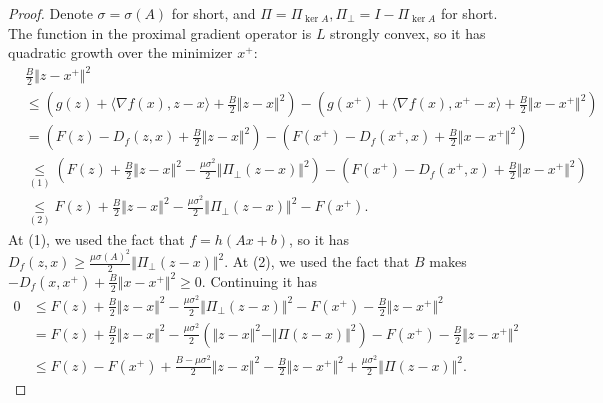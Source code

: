 \documentclass[12pt]{article}
\begin{document}
    \begin{proof}
        Denote $\sigma =\sigma(A)$ for short, and $\Pi = \Pi_{\ker A}, \Pi_{\perp} = I - \Pi_{\ker A}$ for short. 
        The function in the proximal gradient operator is $L$ strongly convex, so it has quadratic growth over the minimizer $x^+$: 
        \begin{align*}
            & \frac{B}{2}\Vert z - x^+\Vert^2
            \\
            &\le 
            \left(
                g(z) + \langle \nabla f(x), z - x\rangle + \frac{B}{2}\Vert z - x\Vert^2
            \right)
            - \left(
                g(x^+) + \langle \nabla f(x), x^+ - x\rangle + \frac{B}{2}\Vert x - x^+\Vert^2
            \right)
            \\
            &=
            \left(
                F(z) - D_f(z, x) + \frac{B}{2}\Vert z - x\Vert^2
            \right) - 
            \left(
                F(x^+) - D_f(x^+, x) + \frac{B}{2}\Vert x - x^+\Vert^2
            \right)
            \\
            &\underset{(1)}{\le}
            \left(
                F(z) + \frac{B}{2}\Vert z - x\Vert^2 
                - \frac{\mu\sigma^2}{2}\Vert \Pi_{\perp}(z - x)\Vert^2
            \right)
            - \left(
                F(x^+) - D_f(x^+, x) + \frac{B}{2}\Vert x - x^+\Vert^2
            \right)
            \\
            &\underset{(2)}{\le} 
            F(z) 
            + \frac{B}{2}\Vert z - x\Vert^2
            - \frac{\mu\sigma^2}{2}\Vert \Pi_{\perp}(z - x)\Vert^2
            - F(x^+). 
        \end{align*}
        At (1), we used the fact that $f = h(Ax + b)$, so it has $D_f(z, x) \ge \frac{\mu\sigma(A)^2}{2}\Vert \Pi_{\perp}(z - x)\Vert^2$. 
        At (2), we used the fact that $B$ makes $- D_f(x, x^+) + \frac{B}{2}\Vert x - x^+\Vert^2 \ge 0$. 
        Continuing it has 
        \begin{align*}
            0 
            &\le 
            F(z) + \frac{B}{2}\Vert z - x\Vert^2 
            - \frac{\mu\sigma^2}{2}\Vert \Pi_{\perp}(z - x)\Vert^2
            - F(x^+)
            - \frac{B}{2}\Vert z - x^+\Vert^2
            \\
            &= 
            F(z) 
            + \frac{B}{2}\Vert z - x\Vert^2 
            - \frac{\mu\sigma^2}{2}\left(
                \Vert z - x\Vert^2 
                - \Vert \Pi(z - x)\Vert^2
            \right)
            - F(x^+)
            - \frac{B}{2}\Vert z - x^+\Vert^2
            \\
            &\le F(z) - F(x^+)
            + \frac{B - \mu\sigma^2}{2}\Vert z - x\Vert^2 
            - \frac{B}{2}\Vert z - x^+\Vert^2
            + \frac{\mu\sigma^2}{2}\Vert \Pi(z - x)\Vert^2. 
        \end{align*}
    \end{proof}
\end{document}

